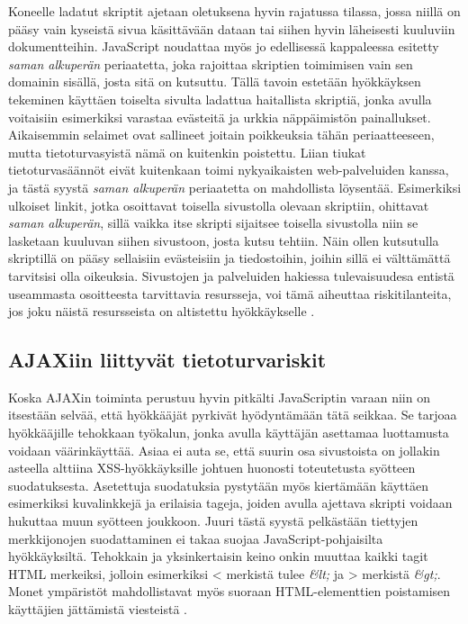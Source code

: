 Koneelle ladatut skriptit ajetaan oletuksena hyvin rajatussa tilassa, jossa niillä on pääsy vain kyseistä sivua käsittävään dataan tai siihen hyvin läheisesti kuuluviin dokumentteihin. 
JavaScript noudattaa myös jo edellisessä kappaleessa esitetty \emph{saman alkuperän} periaatetta, joka rajoittaa skriptien toimimisen vain sen domainin sisällä, josta sitä on kutsuttu.  
Tällä tavoin estetään hyökkäyksen tekeminen käyttäen toiselta sivulta ladattua haitallista skriptiä, jonka avulla voitaisiin esimerkiksi varastaa evästeitä ja urkkia näppäimistön painallukset.
Aikaisemmin selaimet ovat sallineet joitain poikkeuksia tähän periaatteeseen, mutta tietoturvasyistä nämä on kuitenkin poistettu. Liian tiukat tietoturvasäännöt eivät kuitenkaan toimi
nykyaikaisten web-palveluiden kanssa, ja tästä syystä \emph{saman alkuperän} periaatetta on mahdollista löysentää. Esimerkiksi ulkoiset linkit, jotka osoittavat toisella sivustolla olevaan
skriptiin, ohittavat \emph{saman alkuperän}, sillä vaikka itse skripti sijaitsee toisella sivustolla niin se lasketaan kuuluvan siihen sivustoon, josta kutsu tehtiin. Näin ollen 
kutsutulla skriptillä on pääsy sellaisiin evästeisiin ja tiedostoihin, joihin sillä ei välttämättä tarvitsisi olla oikeuksia. Sivustojen ja palveluiden hakiessa tulevaisuudesa
entistä useammasta osoitteesta tarvittavia resursseja, voi tämä aiheuttaa riskitilanteita, jos joku näistä resursseista on altistettu hyökkäykselle \cite{AJAX}.

\subsection{AJAXiin liittyvät tietoturvariskit}

Koska AJAXin toiminta perustuu hyvin pitkälti JavaScriptin varaan niin on itsestään selvää, että hyökkääjät pyrkivät hyödyntämään tätä seikkaa. Se tarjoaa hyökkääjille tehokkaan työkalun,
jonka avulla käyttäjän asettamaa luottamusta voidaan väärinkäyttää. Asiaa ei auta se, että suurin osa sivustoista on jollakin asteella alttiina XSS-hyökkäyksille \cite{WEB2c} johtuen huonosti
toteutetusta syötteen suodatuksesta. Asetettuja suodatuksia pystytään myös kiertämään käyttäen esimerkiksi kuvalinkkejä ja erilaisia tageja, joiden avulla ajettava skripti voidaan 
hukuttaa muun syötteen joukkoon. Juuri tästä syystä pelkästään tiettyjen merkkijonojen suodattaminen ei takaa suojaa JavaScript-pohjaisilta hyökkäyksiltä. Tehokkain ja yksinkertaisin keino
onkin muuttaa kaikki tagit HTML merkeiksi, jolloin esimerkiksi < merkistä tulee \emph{\&lt;} ja > merkistä \emph{\&gt;}. Monet ympäristöt mahdollistavat myös suoraan HTML-elementtien
poistamisen käyttäjien jättämistä viesteistä \cite{AJAX}.

